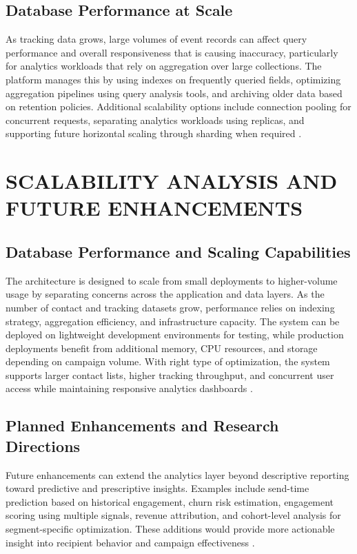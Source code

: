 \documentclass[12pt,journal,compsoc]{IEEEtran}
\begin{document}
\subsection{Database Performance at Scale}
As tracking data grows, large volumes of event records can affect query performance and overall responsiveness that is causing inaccuracy, particularly for analytics workloads that rely on aggregation over large collections. The platform manages this by using indexes on frequently queried fields, optimizing aggregation pipelines using query analysis tools, and archiving older data based on retention policies. Additional scalability options include connection pooling for concurrent requests, separating analytics workloads using replicas, and supporting future horizontal scaling through sharding when required \cite{ref18}.

\section{SCALABILITY ANALYSIS AND FUTURE ENHANCEMENTS}

\subsection{Database Performance and Scaling Capabilities}
The architecture is designed to scale from small deployments to higher-volume usage by separating concerns across the application and data layers. As the number of contact and tracking datasets grow, performance relies on indexing strategy, aggregation efficiency, and infrastructure capacity. The system can be deployed on lightweight development environments for testing, while production deployments benefit from additional memory, CPU resources, and storage depending on campaign volume. With right type of optimization, the system supports larger contact lists, higher tracking throughput, and concurrent user access while maintaining responsive analytics dashboards \cite{ref28}.

\subsection{Planned Enhancements and Research Directions}
Future enhancements can extend the analytics layer beyond descriptive reporting toward predictive and prescriptive insights. Examples include send-time prediction based on historical engagement, churn risk estimation, engagement scoring using multiple signals, revenue attribution, and cohort-level analysis for segment-specific optimization. These additions would provide more actionable insight into recipient behavior and campaign effectiveness \cite{ref24}.
\end{document}
